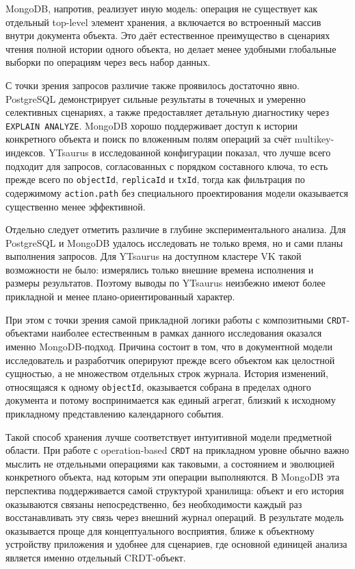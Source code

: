 \documentclass[a4paper,14pt]{extarticle}
\begin{document}
MongoDB, напротив, реализует иную модель: операция не существует как отдельный
top-level элемент хранения, а включается во встроенный массив внутри документа
объекта. Это даёт естественное преимущество в сценариях чтения полной истории
одного объекта, но делает менее удобными глобальные выборки по операциям через
весь набор данных.

С точки зрения запросов различие также проявилось достаточно явно. PostgreSQL
демонстрирует сильные результаты в точечных и умеренно селективных сценариях,
а также предоставляет детальную диагностику через \texttt{EXPLAIN ANALYZE}.
MongoDB хорошо поддерживает доступ к истории конкретного объекта и поиск по
вложенным полям операций за счёт multikey-индексов. YTsaurus в исследованной
конфигурации показал, что лучше всего подходит для запросов, согласованных с
порядком составного ключа, то есть прежде всего по \texttt{objectId},
\texttt{replicaId} и \texttt{txId}, тогда как фильтрация по содержимому
\texttt{action.path} без специального проектирования модели оказывается
существенно менее эффективной.

Отдельно следует отметить различие в глубине экспериментального анализа.
Для PostgreSQL и MongoDB удалось исследовать не только время, но и сами планы
выполнения запросов. Для YTsaurus на доступном кластере VK такой возможности
не было: измерялись только внешние времена исполнения и размеры результатов.
Поэтому выводы по YTsaurus неизбежно имеют более прикладной и менее
плано-ориентированный характер.

При этом с точки зрения самой прикладной логики работы с композитными
\texttt{CRDT}-объектами наиболее естественным в рамках данного исследования
оказался именно MongoDB-подход. Причина состоит в том, что в документной модели
исследователь и разработчик оперируют прежде всего объектом как целостной
 сущностью, а не множеством отдельных строк журнала. История изменений,
 относящаяся к одному \texttt{objectId}, оказывается собрана в пределах одного
 документа и потому воспринимается как единый агрегат, близкий к исходному
 прикладному представлению календарного события.

Такой способ хранения лучше соответствует интуитивной модели предметной области.
При работе с operation-based \texttt{CRDT} на прикладном уровне обычно важно
мыслить не отдельными операциями как таковыми, а состоянием и эволюцией
конкретного объекта, над которым эти операции выполняются. В MongoDB эта
перспектива поддерживается самой структурой хранилища: объект и его история
оказываются связаны непосредственно, без необходимости каждый раз восстанавливать
эту связь через внешний журнал операций. В результате модель оказывается проще
для концептуального восприятия, ближе к объектному устройству приложения и
удобнее для сценариев, где основной единицей анализа является именно отдельный
CRDT-объект.
\end{document}
